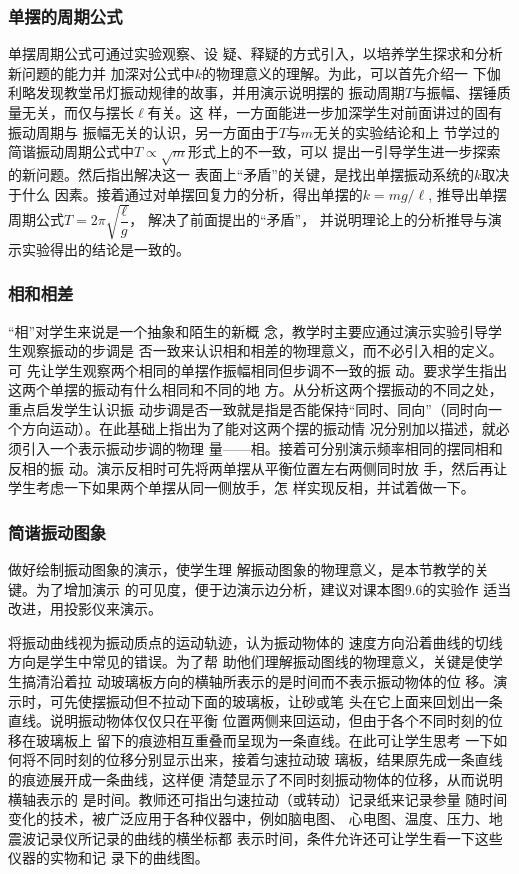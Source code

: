 \subsubsection{单摆的周期公式}

单摆周期公式可通过实验观察、设
疑、释疑的方式引入，以培养学生探求和分析新问题的能力并
加深对公式中$k$的物理意义的理解。为此，可以首先介绍一
下伽利略发现教堂吊灯振动规律的故事，并用演示说明摆的
振动周期$T$与振幅、摆锤质量无关，而仅与摆长$\ell$有关。这
样，一方面能进一步加深学生对前面讲过的固有振动周期与
振幅无关的认识，另一方面由于$T$与$m$无关的实验结论和上
节学过的简谐振动周期公式中$T\propto\sqrt{m}$形式上的不一致，可以
提出一引导学生进一步探索的新问题。然后指出解决这一
表面上“矛盾”的关键，是找出单摆振动系统的$k$取决于什么
因素。接着通过对单摆回复力的分析，得出单摆的$k=mg/\ell$,
推导出单摆周期公式$T=2\pi\sqrt{\dfrac{\ell}{g}}$，
解决了前面提出的“矛盾”，
并说明理论上的分析推导与演示实验得出的结论是一致的。


\subsubsection{相和相差}

“相”对学生来说是一个抽象和陌生的新概
念，教学时主要应通过演示实验引导学生观察振动的步调是
否一致来认识相和相差的物理意义，而不必引入相的定义。可
先让学生观察两个相同的单摆作振幅相同但步调不一致的振
动。要求学生指出这两个单摆的振动有什么相同和不同的地
方。从分析这两个摆振动的不同之处，重点启发学生认识振
动步调是否一致就是指是否能保持“同时、同向”（同时向一
个方向运动）。在此基础上指出为了能对这两个摆的振动情
况分别加以描述，就必须引入一个表示振动步调的物理
量——相。接着可分别演示频率相同的摆同相和反相的振
动。演示反相时可先将两单摆从平衡位置左右两侧同时放
手，然后再让学生考虑一下如果两个单摆从同一侧放手，怎
样实现反相，并试着做一下。

\subsubsection{简谐振动图象}

做好绘制振动图象的演示，使学生理
解振动图象的物理意义，是本节教学的关键。为了增加演示
的可见度，便于边演示边分析，建议对课本图9.6的实验作
适当改进，用投影仪来演示。

将振动曲线视为振动质点的运动轨迹，认为振动物体的
速度方向沿着曲线的切线方向是学生中常见的错误。为了帮
助他们理解振动图线的物理意义，关键是使学生搞清沿着拉
动玻璃板方向的横轴所表示的是时间而不表示振动物体的位
移。演示时，可先使摆振动但不拉动下面的玻璃板，让砂或笔
头在它上面来回划出一条直线。说明振动物体仅仅只在平衡
位置两侧来回运动，但由于各个不同时刻的位移在玻璃板上
留下的痕迹相互重叠而呈现为一条直线。在此可让学生思考
一下如何将不同时刻的位移分别显示出来，接着匀速拉动玻
璃板，结果原先成一条直线的痕迹展开成一条曲线，这样便
清楚显示了不同时刻振动物体的位移，从而说明横轴表示的
是时间。教师还可指出匀速拉动（或转动）记录纸来记录参量
随时间变化的技术，被广泛应用于各种仪器中，例如脑电图、
心电图、温度、压力、地震波记录仪所记录的曲线的横坐标都
表示时间，条件允许还可让学生看一下这些仪器的实物和记
录下的曲线图。

